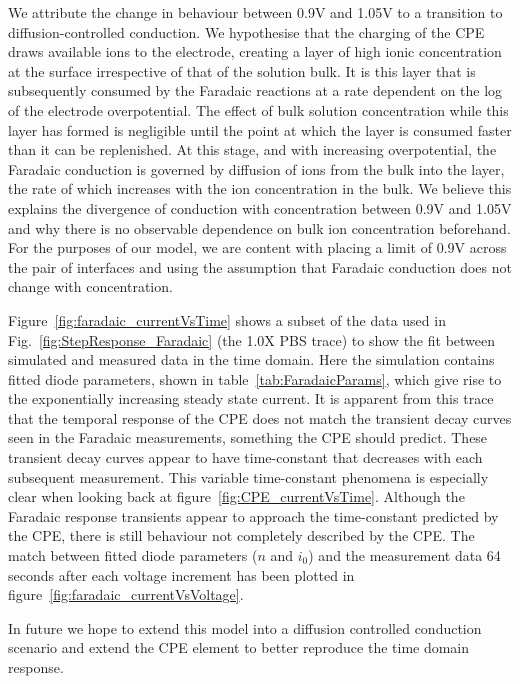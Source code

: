 \documentclass[journal, a4paper]{IEEEtran}
\begin{document}
We attribute the change in behaviour between 0.9\thinspace V and 1.05\thinspace V to a transition to diffusion-controlled conduction.
We hypothesise that the charging of the CPE draws available ions to the electrode, creating a layer of high ionic concentration at the surface irrespective of that of the solution bulk. It is this layer that is subsequently consumed by the Faradaic reactions at a rate dependent on the log of the electrode overpotential.  The effect of bulk solution concentration while this layer has formed is negligible until the point at which the layer is consumed faster than it can be replenished. At this stage, and with increasing overpotential, the Faradaic conduction is governed by diffusion of ions from the bulk into the layer, the rate of which increases with the ion concentration in the bulk. We believe this explains the divergence of conduction with concentration between 0.9\thinspace V and 1.05\thinspace V and why there is no observable dependence on bulk ion concentration beforehand.
For the purposes of our model, we are content with placing a limit of 0.9\thinspace V across the pair of interfaces and using the assumption that Faradaic conduction does not change with concentration. 

{
    \color{blue}
    Figure~\ref{fig:faradaic_currentVsTime} shows a subset of the data used in Fig.~\ref{fig:StepResponse_Faradaic} (the 1.0X PBS trace) to show the fit between simulated and measured data in the time domain. Here the simulation contains fitted diode parameters, shown in table~\ref{tab:FaradaicParams}, which give rise to the exponentially increasing steady state current.     
It is apparent from this trace that the temporal response of the CPE does not match the transient decay curves seen in the Faradaic measurements, something the CPE should predict. These transient decay curves appear to have time-constant that decreases with each subsequent measurement. This variable time-constant phenomena is especially clear when looking back at figure~\ref{fig:CPE_currentVsTime}. Although the Faradaic response transients appear to approach the time-constant predicted by the CPE, there is still behaviour not completely described by the CPE. 
The match between fitted diode parameters ($n$ and $i_{0}$) and the measurement data 64 seconds after each voltage increment has been plotted in figure~\ref{fig:faradaic_currentVsVoltage}. 

In future we hope to extend this model into a diffusion controlled conduction scenario and extend the CPE element to better reproduce the time domain response.
}
\end{document}

